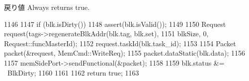 \begin{DoxyReturn}{戻り値}
Always returns true. 
\end{DoxyReturn}



\begin{DoxyCode}
1146 {
1147     if (blk.isDirty()) {
1148         assert(blk.isValid());
1149 
1150         Request request(tags->regenerateBlkAddr(blk.tag, blk.set),
1151                         blkSize, 0, Request::funcMasterId);
1152         request.taskId(blk.task_id);
1153 
1154         Packet packet(&request, MemCmd::WriteReq);
1155         packet.dataStatic(blk.data);
1156 
1157         memSidePort->sendFunctional(&packet);
1158 
1159         blk.status &= ~BlkDirty;
1160     }
1161 
1162     return true;
1163 }
\end{DoxyCode}



